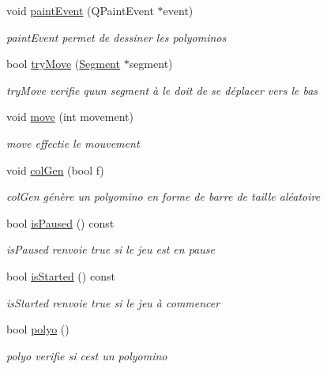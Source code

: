 \begin{DoxyCompactItemize}
\item 
void \hyperlink{class_board_af518da96919d04d1f0dbe0794b61d532}{paint\+Event} (Q\+Paint\+Event $\ast$event)
\begin{DoxyCompactList}\small\item\em paint\+Event permet de dessiner les polyominos \end{DoxyCompactList}\item 
bool \hyperlink{class_board_af4ac464e41d36aeaa587cb03ce6fec34}{try\+Move} (\hyperlink{class_segment}{Segment} $\ast$segment)
\begin{DoxyCompactList}\small\item\em try\+Move verifie qu\textquotesingle{}un segment à le doit de se déplacer vers le bas \end{DoxyCompactList}\item 
void \hyperlink{class_board_a1211e4f86b63cdeacb2f7aed16ca650f}{move} (int movement)
\begin{DoxyCompactList}\small\item\em move effectie le mouvement \end{DoxyCompactList}\item 
void \hyperlink{class_board_a7c04c8ddb76471bff762229c079c9614}{col\+Gen} (bool f)
\begin{DoxyCompactList}\small\item\em col\+Gen génère un polyomino en forme de barre de taille aléatoire \end{DoxyCompactList}\item 
bool \hyperlink{class_board_a65c546b6f6c5904306174afcbe55a2bb}{is\+Paused} () const 
\begin{DoxyCompactList}\small\item\em is\+Paused renvoie true si le jeu est en pause \end{DoxyCompactList}\item 
bool \hyperlink{class_board_ad811426191e931d672c056339935b602}{is\+Started} () const 
\begin{DoxyCompactList}\small\item\em is\+Started renvoie true si le jeu à commencer \end{DoxyCompactList}\item 
bool \hyperlink{class_board_a8759b41634150be8a0b7767f59d93acd}{polyo} ()
\begin{DoxyCompactList}\small\item\em polyo verifie si c\textquotesingle{}est un polyomino \end{DoxyCompactList}\item 

\end{DoxyCompactItemize}

